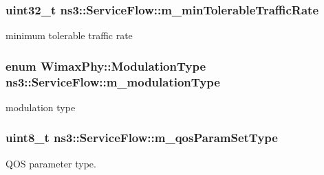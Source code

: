 \subsubsection[{\texorpdfstring{m\+\_\+min\+Tolerable\+Traffic\+Rate}{m_minTolerableTrafficRate}}]{\setlength{\rightskip}{0pt plus 5cm}uint32\+\_\+t ns3\+::\+Service\+Flow\+::m\+\_\+min\+Tolerable\+Traffic\+Rate\hspace{0.3cm}{\ttfamily [private]}}\hypertarget{classns3_1_1ServiceFlow_a3b8d632776a81daa9306c1e976685aee}{}\label{classns3_1_1ServiceFlow_a3b8d632776a81daa9306c1e976685aee}


minimum tolerable traffic rate 

\subsubsection[{\texorpdfstring{m\+\_\+modulation\+Type}{m_modulationType}}]{\setlength{\rightskip}{0pt plus 5cm}enum {\bf Wimax\+Phy\+::\+Modulation\+Type} ns3\+::\+Service\+Flow\+::m\+\_\+modulation\+Type\hspace{0.3cm}{\ttfamily [private]}}\hypertarget{classns3_1_1ServiceFlow_a0f223bac27e2db3d1508611d48379587}{}\label{classns3_1_1ServiceFlow_a0f223bac27e2db3d1508611d48379587}


modulation type 

\subsubsection[{\texorpdfstring{m\+\_\+qos\+Param\+Set\+Type}{m_qosParamSetType}}]{\setlength{\rightskip}{0pt plus 5cm}uint8\+\_\+t ns3\+::\+Service\+Flow\+::m\+\_\+qos\+Param\+Set\+Type\hspace{0.3cm}{\ttfamily [private]}}\hypertarget{classns3_1_1ServiceFlow_a76222bd599cc4e27578bafba5304d158}{}\label{classns3_1_1ServiceFlow_a76222bd599cc4e27578bafba5304d158}


Q\+OS parameter type. 

